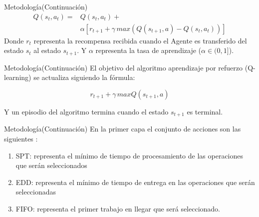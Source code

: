 \documentclass{beamer}
\begin{document}
\begin{frame}{Metodología}{(Continuación)}
    \begin{equation}
    	\begin{split}
    		\displaystyle	Q(s_t,a_t)  = &Q(s_t,a_t) + \\ & \alpha[r_{t+1} + \gamma \, max(Q(s_{t+1},a) - Q(s_t,a_t) )] \label{eq:1}
    	\end{split}
    \end{equation}
    Donde $r_t$ representa la recompensa recibida cuando el Agente es transferido del estado $s_{t}$ al estado $s_{t+1}$. Y $\alpha$ representa la tasa de aprendizaje ($\alpha \in (0,1]$).
    
\end{frame}

\begin{frame}{Metodología}{(Continuación)}
    El objetivo del algoritmo aprendizaje por refuerzo (Q-learning) se actualiza siguiendo la fórmula:
    
    \begin{equation}
    	r_{t+1} + \gamma \, max Q(s_{t+1},a)
    \end{equation} 

Y un episodio del algoritmo termina cuando el estado $s_{t+1}$ es terminal.

\end{frame}

\begin{frame}{Metodología}{(Continuación)}
	En la primer capa el conjunto de acciones son las siguientes \citep{zhao2019improved}:
	
	\begin{enumerate}
		\item SPT: representa el mínimo de tiempo de procesamiento de las operaciones que serán seleccionados
		\item EDD: representa el mínimo de tiempo de entrega en las operaciones que serán seleccionadas
		\item FIFO: representa el primer trabajo en llegar que será seleccionado.
	\end{enumerate}
\end{frame}
\end{document}
